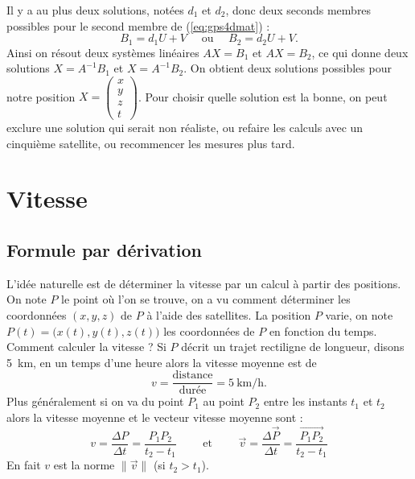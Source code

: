 \documentclass[class=report,crop=false]{standalone}
\newcommand{\vect}{\overrightarrow}
\begin{document}
Il y a au plus deux solutions, notées $d_1$ et $d_2$,
donc deux seconds membres possibles pour
le second membre de (\ref{eq:gps4dmat})  :
$$B_1 = d_1U+V \quad \text{ ou } \quad B_2 = d_2U+V.$$
Ainsi on résout deux systèmes linéaires
$AX=B_1$ et $AX=B_2$, ce qui donne 
deux solutions $X = A^{-1}B_1$ et $X = A^{-1}B_2$.
On obtient deux solutions possibles pour notre position 
$X=\left(\begin{smallmatrix}x\\y\\z\\t\end{smallmatrix}\right)$.
Pour choisir quelle solution est la bonne, on peut exclure une solution
qui serait non réaliste, ou refaire les calculs avec un cinquième satellite,
ou recommencer les mesures plus tard.

% 
% 
%   
% 


\section{Vitesse}

\subsection{Formule par dérivation}

L'idée naturelle est de déterminer la vitesse 
par un calcul à partir des positions.
On note $P$ le point où l'on se trouve, on a vu comment déterminer
les coordonnées $(x,y,z)$ de $P$ à l'aide des satellites.
La position $P$ varie,
on note $P(t) = \big(x(t),y(t),z(t)\big)$ les coordonnées de $P$ en fonction du temps.
Comment calculer la vitesse ? Si $P$ décrit un trajet rectiligne
de longueur,  disons \SI{5}{\kilo\meter}, en un temps d'une heure alors la vitesse moyenne est de 
$$v = \frac{\text{distance}}{\text{durée}} = \SI{5}{\kilo\meter\per\hour}.$$
Plus généralement si on va du point $P_1$ au point $P_2$ entre les instants $t_1$ et $t_2$ alors
la vitesse moyenne et le vecteur vitesse moyenne sont :
$$v = \frac{\Delta P}{\Delta t} = \frac{P_1P_2}{t_2-t_1} \qquad \text{ et } \qquad
\vect v = \frac{\Delta \vect{P}}{\Delta t} = \frac{\vect{P_1P_2}}{t_2-t_1}$$
En fait $v$ est la norme $\| \vect v\|$ (si $t_2>t_1$).
\end{document}
